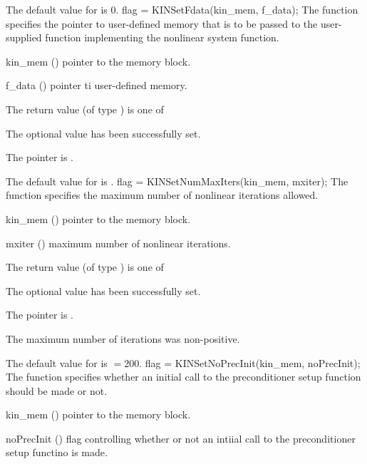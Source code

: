 {
  The default value for  is $0$.
}
{
flag = KINSetFdata(kin\_mem, f\_data);
}
{
  The function  specifies the pointer to user-defined memory
  that is to be passed to the user-supplied function implementing the nonlinear
  system function.
}
{
  \begin{args}
  \item[kin\_mem] ()
    pointer to the {\kinsol} memory block.
  \item[f\_data] ()
    pointer ti user-defined memory.
  \end{args}
}
{
  The return value  (of type ) is one of
  \begin{args}
  \item[\Id{KIN\_SUCCESS}] 
    The optional value has been successfully set.
  \item[\Id{KIN\_MEM\_NULL}]
    The  pointer is .
  \end{args}
}
{
  The default value for  is .
}
{
flag = KINSetNumMaxIters(kin\_mem, mxiter);
}
{
  The function  specifies the maximum number of 
  nonlinear iterations allowed.
}
{
  \begin{args}
  \item[kin\_mem] ()
    pointer to the {\kinsol} memory block.
  \item[mxiter] ()
    maximum number of nonlinear iterations.
  \end{args}
}
{
  The return value  (of type ) is one of
  \begin{args}
  \item[\Id{KIN\_SUCCESS}] 
    The optional value has been successfully set.
  \item[\Id{KIN\_MEM\_NULL}]
    The  pointer is .
  \item[\Id{KIN\_ILL\_INPUT}]
    The maximum number of iterations was non-positive.
  \end{args}
}
{
  The default value for  is  $=200$.
}
{
flag = KINSetNoPrecInit(kin\_mem, noPrecInit);
}
{
  The function  specifies whether an initial call
  to the preconditioner setup function should be made or not.
}
{
  \begin{args}[noPrecInit]
  \item[kin\_mem] ()
    pointer to the {\kinsol} memory block.
  \item[noPrecInit] ()
    flag controlling whether or not an intiial call 
    to the preconditioner setup functino is made.
  \end{args}
}
